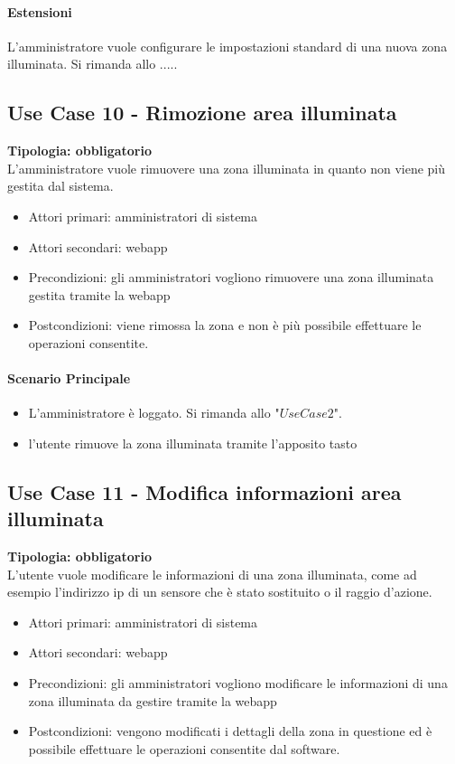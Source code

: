\documentclass[12pt]{article}
\begin{document}
\paragraph{Estensioni} L'amministratore vuole configurare le impostazioni standard di una nuova zona illuminata. Si rimanda allo .....

\subsection{Use Case 10 - Rimozione area illuminata}
\textbf{Tipologia: obbligatorio} \\
L'amministratore vuole rimuovere una zona illuminata in quanto non viene più gestita dal sistema.
\begin{itemize}
	\item Attori primari: amministratori di sistema
	\item Attori secondari: webapp
	\item Precondizioni: gli amministratori vogliono rimuovere una zona illuminata gestita tramite la webapp
	\item Postcondizioni: viene rimossa la zona e non è più possibile effettuare le operazioni consentite.
\end{itemize}
\paragraph{Scenario Principale}
\begin{itemize}
	\item L'amministratore è loggato. Si rimanda allo "$Use Case 2$".
	\item l'utente rimuove la zona illuminata tramite l'apposito tasto
\end{itemize}

\subsection{Use Case 11 - Modifica informazioni area illuminata}
\textbf{Tipologia: obbligatorio} \\
L'utente vuole modificare le informazioni di una zona illuminata, come ad esempio l'indirizzo ip di un sensore che è stato sostituito o il raggio d'azione.
\begin{itemize}
	\item Attori primari: amministratori di sistema
	\item Attori secondari: webapp
	\item Precondizioni: gli amministratori vogliono modificare le informazioni di una zona illuminata da gestire tramite la webapp
	\item Postcondizioni: vengono modificati i dettagli della zona in questione ed è possibile effettuare le operazioni consentite dal software.
\end{itemize}
\end{document}
